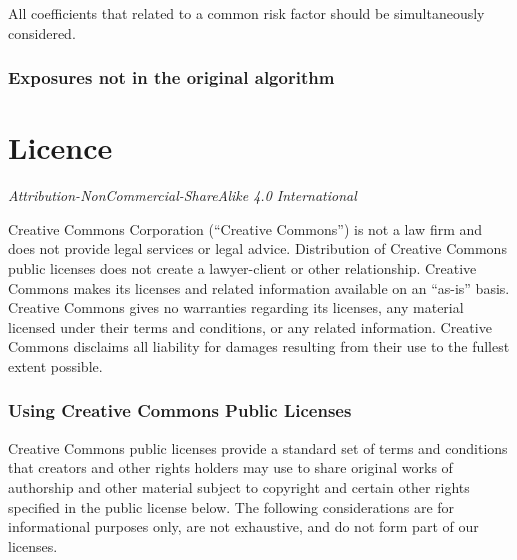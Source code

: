 \documentclass[]{book}
\begin{document}
All coefficients that related to a common risk factor should be simultaneously considered.

\hypertarget{exposures-not-in-the-original-algorithm}{%
\subsection{Exposures not in the original algorithm}\label{exposures-not-in-the-original-algorithm}}

\hypertarget{licence}{%
\chapter{Licence}\label{licence}}

\emph{Attribution-NonCommercial-ShareAlike 4.0 International}

Creative Commons Corporation (``Creative Commons'') is not a law firm and does not provide legal services or legal advice. Distribution of Creative Commons public licenses does not create a lawyer-client or other relationship. Creative Commons makes its licenses and related information available on an ``as-is'' basis. Creative Commons gives no warranties regarding its licenses, any material licensed under their terms and conditions, or any related information. Creative Commons disclaims all liability for damages resulting from their use to the fullest extent possible.

\hypertarget{using-creative-commons-public-licenses}{%
\subsection{Using Creative Commons Public Licenses}\label{using-creative-commons-public-licenses}}

Creative Commons public licenses provide a standard set of terms and conditions that creators and other rights holders may use to share original works of authorship and other material subject to copyright and certain other rights specified in the public license below. The following considerations are for informational purposes only, are not exhaustive, and do not form part of our licenses.
\end{document}
